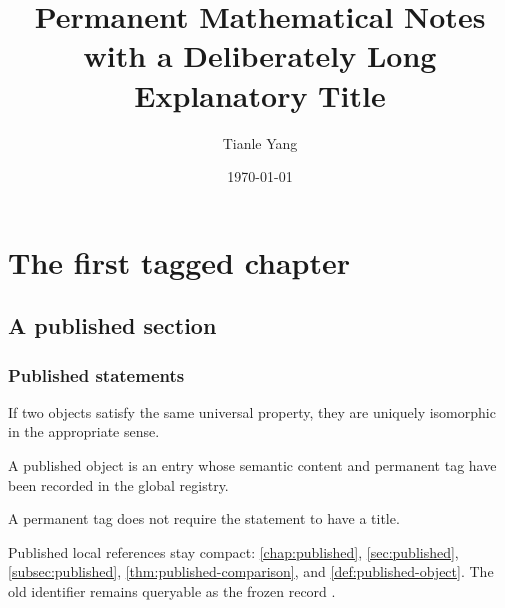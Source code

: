 \documentclass[sectionlevel=book,status=draft]{noteformyself}
\title{Permanent Mathematical Notes with a Deliberately Long Explanatory Title}
\author{Tianle Yang}
\date{\today}
\begin{document}
\maketitle
\tableofcontents

\chapter[
  status=published,
  tag=0AB,
  label=\labelNFM{chap:published}
]{The first tagged chapter}

\section[
  status=published,
  tag=0ABCD,
  label=\labelNFM{sec:published}
]{A published section}

\subsection[
  status=published,
  tag=0ABCDS1,
  label=\labelNFM{subsec:published}
]{Published statements}

\begin{theorem}[
  title={Fundamental comparison},
  status=published,
  tag=0ABCDEF,
  label=\labelNFM{thm:published-comparison}
]
  If two objects satisfy the same universal property, they are uniquely
  isomorphic in the appropriate sense.
\end{theorem}

\begin{definition}[
  status=published,
  tag=0ABCDE1,
  label=\labelNFM{def:published-object}
]
  A published object is an entry whose semantic content and permanent tag have
  been recorded in the global registry.
\end{definition}

\begin{theorem}[
  status=published,
  tag=0ABCDE2,
  label=\labelNFM{thm:untitled-published}
]
  A permanent tag does not require the statement to have a title.
\end{theorem}

Published local references stay compact: \cref{chap:published},
\cref{sec:published}, \cref{subsec:published},
\cref{thm:published-comparison}, and \cref{def:published-object}.
The old identifier remains queryable as the frozen record
.
\end{document}
